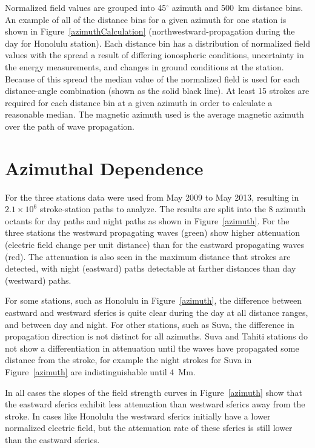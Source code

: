 \documentclass[draft,jgrga]{AGUTeX}
\begin{document}
\begin{article}
Normalized field values are grouped into 45$^\circ$ azimuth and 500~km distance bins.
An example of all of the distance bins for a given azimuth for one station is shown in Figure~\ref{azimuthCalculation} (northwestward-propagation during the day for Honolulu station).
Each distance bin has a distribution of normalized field values with the spread a result of differing ionospheric conditions, uncertainty in the energy measurements, and changes in ground conditions at the station.
Because of this spread the median value of the normalized field is used for each distance-angle combination (shown as the solid black line).
At least 15 strokes are required for each distance bin at a given azimuth in order to calculate a reasonable median.
The magnetic azimuth used is the average magnetic azimuth over the path of wave propagation.

\section{Azimuthal Dependence}

For the three stations data were used from May 2009 to May 2013, resulting in $2.1\times10^6$ stroke-station paths to analyze.
The results are split into the 8 azimuth octants for day paths and night paths as shown in Figure~\ref{azimuth}.
For the three stations the westward propagating waves (green) show higher attenuation (electric field change per unit distance) than for the eastward propagating waves (red).
The attenuation is also seen in the maximum distance that strokes are detected, with night (eastward) paths detectable at farther distances than day (westward) paths.

For some stations, such as Honolulu in Figure~\ref{azimuth}, the difference between eastward and westward sferics is quite clear during the day at all distance ranges, and between day and night.
For other stations, such as Suva, the difference in propagation direction is not distinct for all azimuths.
Suva and Tahiti stations do not show a differentiation in attenuation until the waves have propagated some distance from the stroke, for example the night strokes for Suva in Figure~\ref{azimuth} are indistinguishable until 4~Mm.

In all cases the slopes of the field strength curves in Figure~\ref{azimuth} show that the eastward sferics exhibit less attenuation than westward sferics away from the stroke.
In cases like Honolulu the westward sferics initially have a lower normalized electric field, but the attenuation rate of these sferics is still lower than the eastward sferics.
  

\end{article}
\end{document}
